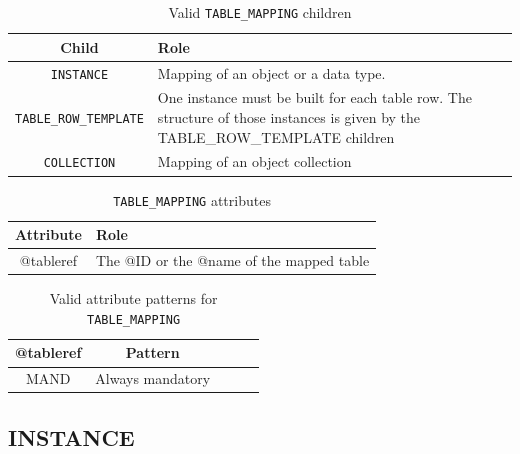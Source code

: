 \documentclass[11pt,a4paper]{ivoa}
\begin{document}
\begin{table}[!h]
\small
\centering
\begin{tabulary}{\linewidth}{|c|J|}       
       \hline 
           \textbf{Child} &  
           \textbf{Role}\\
       \hline         \hline  
           \texttt{INSTANCE}    & 
           Mapping of an object or a data type.  \\              
       \hline  
            \texttt{TABLE\_ROW\_TEMPLATE}    &  
            One instance must be built for each table row. 
             \newline The structure of those instances is given by the TABLE\_ROW\_TEMPLATE children \\              
       \hline  
             \texttt{COLLECTION}    &  
             Mapping of an object collection \\       
       \hline 
     \end{tabulary}
     \caption{Valid \texttt{TABLE\_MAPPING} children} 
     \label{tbl:templ-children}
 \end{table}


\begin{table}[!h]
\small
\centering
\begin{tabulary}{\linewidth}{|c|J|}       
       \hline 
            \textbf{Attribute} & 
            \textbf {Role}\\
       \hline         \hline  
            @tableref  & 
            The @ID or the @name of the mapped table  \\
       \hline 
     \end{tabulary}
     \caption{\texttt{TABLE\_MAPPING} attributes} 
     \label{tbl:templ-att}
 \end{table}

\begin{table}[!h]
\small
\centering
\begin{tabulary}{\linewidth}{|c|c|c|c|J|}
    \hline 
        \textbf{@tableref} &
        \textbf{Pattern}\\
    \hline      \hline  
        MAND &   
        Always mandatory\\
   \hline 
\end{tabulary}
     \caption{Valid attribute patterns for  \texttt{TABLE\_MAPPING}} 
     \label{tbl:templ-pattern}
 \end{table}

%
%

\subsection{INSTANCE}
\end{document}
